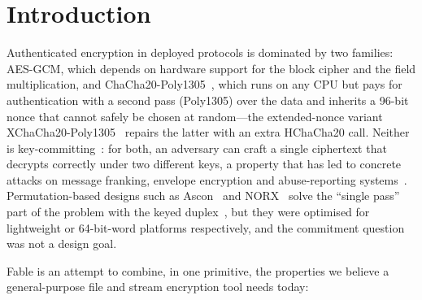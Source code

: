 \documentclass{iacrtrans}
\newcommand{\Fable}{\textsf{Fable}\xspace}
\begin{document}
\section{Introduction}
\label{sec:intro}

Authenticated encryption in deployed protocols is dominated by two families: AES-GCM, which depends on hardware support for the block cipher and the field multiplication, and ChaCha20-Poly1305~\cite{RFC8439}, which runs on any CPU but pays for authentication with a second pass (Poly1305) over the data and inherits a 96-bit nonce that cannot safely be chosen at random---the extended-nonce variant XChaCha20-Poly1305~\cite{XChaCha} repairs the latter with an extra HChaCha20 call. Neither is key-committing~\cite{BH22}: for both, an adversary can craft a single ciphertext that decrypts correctly under two different keys, a property that has led to concrete attacks on message franking, envelope encryption and abuse-reporting systems~\cite{GLR17,DGRW18,ADGKLS22}. Permutation-based designs such as Ascon~\cite{Ascon21} and NORX~\cite{NORX14} solve the ``single pass'' part of the problem with the keyed duplex~\cite{BDPV11}, but they were optimised for lightweight or 64-bit-word platforms respectively, and the commitment question was not a design goal.

\Fable is an attempt to combine, in one primitive, the properties we believe a general-purpose file and stream encryption tool needs today:
\end{document}
